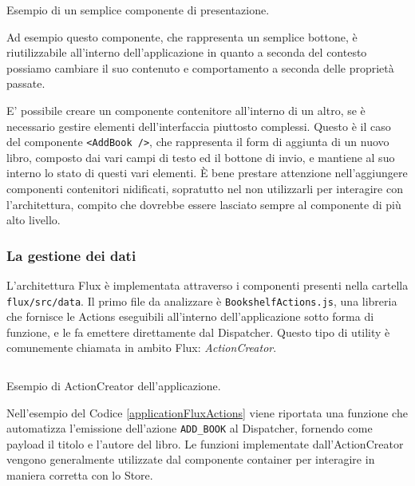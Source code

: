 \begin{listing}[ht]
\inputminted{jsx}{sources/applicationFluxButton.js}
\caption{Esempio di un semplice componente di presentazione.} 
\label{applicationFluxButton} 
\end{listing} 

\noindent
Ad esempio questo componente, che rappresenta un semplice bottone, è riutilizzabile all'interno dell'applicazione in quanto a seconda del contesto possiamo cambiare il suo contenuto e comportamento a seconda delle proprietà passate.

E' possibile creare un componente contenitore all'interno di un altro, se è necessario gestire elementi dell'interfaccia piuttosto complessi. Questo è il caso del componente \texttt{<AddBook />}, che rappresenta il form di aggiunta di un nuovo libro, composto dai vari campi di testo ed il bottone di invio, e mantiene al suo interno lo stato di questi vari elementi. È bene prestare attenzione nell'aggiungere componenti contenitori nidificati, sopratutto nel non utilizzarli per interagire con l'architettura, compito che dovrebbe essere lasciato sempre al componente di più alto livello.

\subsubsection*{La gestione dei dati}
L'architettura Flux è implementata attraverso i componenti presenti nella cartella \texttt{flux/src/data}. Il primo file da analizzare è \texttt{BookshelfActions.js}, una libreria che fornisce le Actions eseguibili all'interno dell'applicazione sotto forma di funzione, e le fa emettere direttamente dal Dispatcher. Questo tipo di utility è comunemente chiamata in ambito Flux: \textit{ActionCreator}.

\begin{listing}[ht]
\inputminted{jsx}{sources/applicationFluxActions.js}
\caption{Esempio di ActionCreator dell'applicazione.} 
\label{applicationFluxActions} 
\end{listing} 

\noindent
Nell'esempio del Codice \ref{applicationFluxActions} viene riportata una funzione che automatizza l'emissione dell'azione \texttt{ADD_BOOK} al Dispatcher, fornendo come payload il titolo e l'autore del libro.
Le funzioni implementate dall'ActionCreator vengono generalmente utilizzate dal componente container per interagire in maniera corretta con lo Store.

